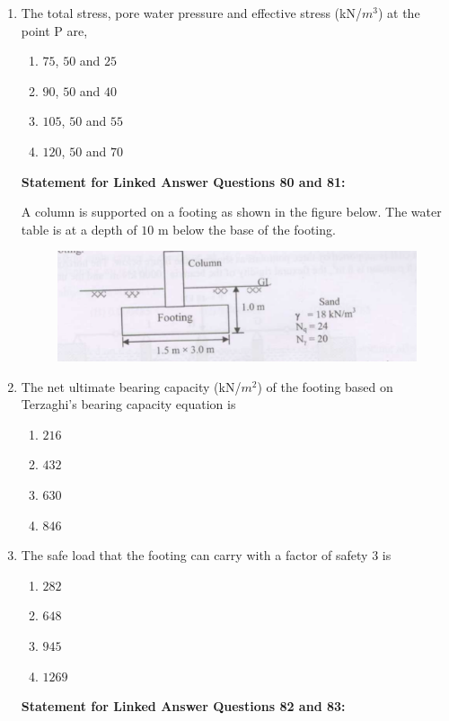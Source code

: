 \documentclass[journal]{IEEEtran}
\begin{document}
\begin{enumerate}
\item The total stress, pore water pressure and effective stress (kN/$m^{3}$) at the point P are,  \hfill {}
\begin{enumerate}
\item $75$, $50$ and $25$
\item $90$, $50$ and $40$
\item $105$, $50$ and $55$
\item $120$, $50$ and $70$
\end{enumerate}



\textbf{Statement for Linked Answer Questions 80 and 81:}

A column is supported on a footing as shown in the figure below. The water table is at a depth of $10$ m below the base of the footing.


\begin{figure}[H]
    \centering
    \includegraphics[width=0.6\columnwidth]{figs/fig13.png} 
    \caption{}
    \label{fig:placeholder}
\end{figure}


\item The net ultimate bearing capacity (kN/$m^{2}$) of the footing based on Terzaghi's bearing capacity equation is \hfill {}
\begin{enumerate}
\item $216$
\item $432$
\item $630$
\item $846$
\end{enumerate}

\item The safe load  that the footing can carry with a factor of safety $3$ is \hfill {}
\begin{enumerate}
\item $282$
\item $648$
\item $945$
\item $1269$
\end{enumerate}


\textbf{Statement for Linked Answer Questions 82 and 83:}


\end{enumerate}
\end{document}
